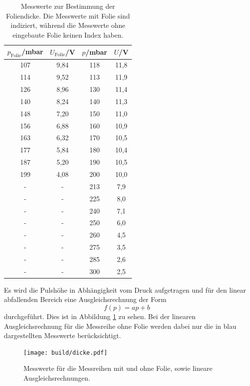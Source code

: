 \begin{table}[htp]
	\begin{center}
    \caption{Messwerte zur Bestimmung der Foliendicke. Die Messwerte mit Folie sind indiziert, während die Messwerte ohne eingebaute Folie keinen Index haben.}
    \label{tab:dicke}
		\begin{tabular}{cccc}
		\toprule
			{$p_\text{Folie}$/mbar} & {$U_{\text{Folie}}$/V} & {$p$/mbar} & {$U$/V}\\
			\midrule
			107 & 9,84 & 118 & 11,8\\
			114 & 9,52 & 113 & 11,9\\
			126 & 8,96 & 130 & 11,4\\
			140 & 8,24 & 140 & 11,3\\
			148 & 7,20 & 150 & 11,0\\
			156 & 6,88 & 160 & 10,9\\
			163 & 6,32 & 170 & 10,5\\
			177 & 5,84 & 180 & 10,4\\
			187 & 5,20 & 190 & 10,5\\
			199 & 4,08 & 200 & 10,0\\
			- & -  & 213 & 7,9\\
			- & -  & 225 & 8,0\\
			- & -  & 240 & 7,1\\
			- & -  & 250 & 6,0\\
			- & -  & 260 & 4,5\\
			- & -  & 275 & 3,5\\
			- & -  & 285 & 2,6\\
			- & -  & 300 & 2,5\\
		\bottomrule
		\end{tabular}
	\end{center}
\end{table}

Es wird die Pulshöhe in Abhängigkeit vom Druck aufgetragen und für den
linear abfallenden Bereich eine Ausgleichsrechnung der Form
\begin{equation*}
  f(p)=ap+b
\end{equation*}
durchgeführt. Dies ist in Abbildung \ref{fig:dicke} zu sehen. Bei der linearen Ausgleichsrechnung
für die Messreihe ohne Folie werden dabei nur die in blau dargestellten Messwerte berücksichtigt.

\begin{figure}
  \centering
  \texttt{[image: build/dicke.pdf]}
  \caption{Messwerte für die Messreihen mit und ohne Folie, sowie lineare Ausgleichsrechnungen.}
  \label{fig:dicke}
\end{figure}

